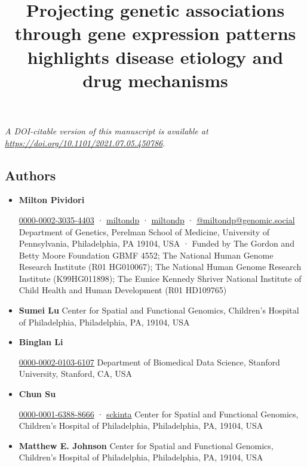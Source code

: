 \documentclass[
        11pt,
]{article}
\title{Projecting genetic associations through gene expression patterns highlights disease etiology and drug mechanisms}
\author{}
\date{}
\begin{document}
\maketitle

\emph{A DOI-citable version of this manuscript is available at \url{https://doi.org/10.1101/2021.07.05.450786}}.

\hypertarget{authors}{%
\subsection{Authors}\label{authors}}

\begin{itemize}
\item
  \textbf{Milton Pividori}
  
  \href{https://orcid.org/0000-0002-3035-4403}{0000-0002-3035-4403}
  · 
  \href{https://github.com/miltondp}{miltondp}
  · 
  \href{https://twitter.com/miltondp}{miltondp}
  · 
  \href{https://genomic.social/@miltondp}{@miltondp@genomic.social}
  Department of Genetics, Perelman School of Medicine, University of Pennsylvania, Philadelphia, PA 19104, USA
  · Funded by The Gordon and Betty Moore Foundation GBMF 4552; The National Human Genome Research Institute (R01 HG010067); The National Human Genome Research Institute (K99HG011898); The Eunice Kennedy Shriver National Institute of Child Health and Human Development (R01 HD109765)
\item
  \textbf{Sumei Lu}
  Center for Spatial and Functional Genomics, Children's Hospital of Philadelphia, Philadelphia, PA, 19104, USA
\item
  \textbf{Binglan Li}
  
  \href{https://orcid.org/0000-0002-0103-6107}{0000-0002-0103-6107}
  Department of Biomedical Data Science, Stanford University, Stanford, CA, USA
\item
  \textbf{Chun Su}
  
  \href{https://orcid.org/0000-0001-6388-8666}{0000-0001-6388-8666}
  · 
  \href{https://github.com/sckinta}{sckinta}
  Center for Spatial and Functional Genomics, Children's Hospital of Philadelphia, Philadelphia, PA, 19104, USA
\item
  \textbf{Matthew E. Johnson}
  Center for Spatial and Functional Genomics, Children's Hospital of Philadelphia, Philadelphia, PA, 19104, USA

\end{itemize}
\end{document}
